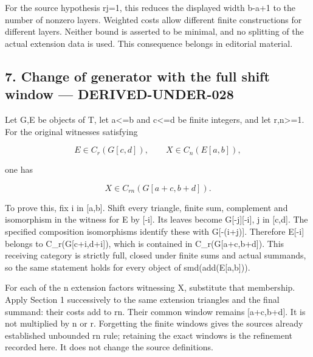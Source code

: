 \documentclass[11pt]{article}
\begin{document}
For the source hypothesis rj\allowbreak{}=1,\allowbreak{} this reduces the displayed width b-a\allowbreak{}+1 to the number of nonzero layers. Weighted costs allow different finite constructions for different layers. Neither bound is asserted to be minimal,\allowbreak{} and no splitting of the actual extension data is used. This consequence belongs in editorial material.

\subsection{7. Change of generator with the full shift window --- DERIVED-UNDER-028}\label{proofs-10691-11108-change-of-generator-with-the-full-shift-window-derived-under-028}

Let G,\allowbreak{}E be objects of T,\allowbreak{} let a<\allowbreak{}=b and c<\allowbreak{}=d be finite integers,\allowbreak{} and let r,\allowbreak{}n>\allowbreak{}=1. For the original witnesses satisfying

\[
 E\in C_r(G[c,d]),\qquad X\in C_n(E[a,b]),
\]

one has

\[
 X\in C_{rn}(G[a+c,b+d]).
\]

To prove this,\allowbreak{} fix i in [a,\allowbreak{}b]\allowbreak{}. Shift every triangle,\allowbreak{} finite sum,\allowbreak{} complement and isomorphism in the witness for E by [-i]\allowbreak{}. Its leaves become G[-j]\allowbreak{}[-i]\allowbreak{},\allowbreak{} j in [c,\allowbreak{}d]\allowbreak{}. The specified composition isomorphisms identify these with G[-(i\allowbreak{}+j)\allowbreak{}]\allowbreak{}. Therefore E[-i]\allowbreak{} belongs to C\_\allowbreak{}r(G[c\allowbreak{}+i,\allowbreak{}d\allowbreak{}+i]\allowbreak{})\allowbreak{},\allowbreak{} which is contained in C\_\allowbreak{}r(G[a\allowbreak{}+c,\allowbreak{}b\allowbreak{}+d]\allowbreak{})\allowbreak{}. This receiving category is strictly full,\allowbreak{} closed under finite sums and actual summands,\allowbreak{} so the same statement holds for every object of smd(add(E[a,\allowbreak{}b]\allowbreak{})\allowbreak{})\allowbreak{}.

For each of the n extension factors witnessing X,\allowbreak{} substitute that membership. Apply Section 1 successively to the same extension triangles and the final summand:\allowbreak{} their costs add to rn. Their common window remains [a\allowbreak{}+c,\allowbreak{}b\allowbreak{}+d]\allowbreak{}. It is not multiplied by n or r. Forgetting the finite windows gives the source\textquotesingle s already established unbounded rn rule; retaining the exact windows is the refinement recorded here. It does not change the source definitions.
\end{document}
